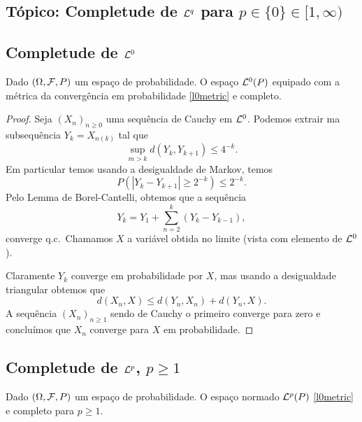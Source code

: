 \begin{topics}
\section{Tópico: Completude de ${\mathcal L}^q$ para $p\in \{0\}\in [1,\infty)$}


\subsection{Completude de ${\mathcal L}^0$}

\begin{theorem}
Dado $(\Omega,{\mathcal F},P)$ um espaço de probabilidade.
O espaço ${\mathcal L}^0(P)$ equipado com a métrica  da convergência em probabilidade \eqref{l0metric} e completo.

\end{theorem}


\begin{proof}


Seja $(X_n)_{n\ge 0}$ uma sequência de Cauchy em ${\mathcal L}^0$.
Podemos extrair ma subsequência $Y_k=X_{n(k)}$ tal que
\begin{equation}
\sup_{m>k} d(Y_k,Y_{k+1})\le  4^{-k}.
\end{equation}
Em particular temos usando a desigualdade de Markov, temos
\begin{equation}
P(|Y_k-Y_{k+1}|\ge 2^{-k})\le 2^{-k}.
\end{equation}
Pelo Lemma de Borel-Cantelli, obtemos que a sequência
$$Y_k=Y_1+\sum_{n=2}^k (Y_k-Y_{k-1}),$$
 converge q.c.\ Chamamos $X$ a variável obtida no limite (vista com elemento de ${\mathcal L}^0$).

 \medskip

 Claramente $Y_k$ converge em probabilidade por $X$, mas usando a desigualdade triangular obtemos que
 $$d(X_n,X)\le d(Y_{n},X_n)+d(Y_n,X).$$
 A sequência $(X_n)_{n\ge 1}$ sendo de Cauchy o primeiro converge para zero e concluímos que
 $X_n$ converge para $X$ em probabilidade.
\end{proof}

\subsection{Completude de ${\mathcal L}^p$, $p\ge 1$}


 \begin{theorem}
Dado $(\Omega,{\mathcal F},P)$ um espaço de probabilidade.
O espaço normado ${\mathcal L}^p(P)$ \eqref{l0metric} e completo para $p\ge 1$.

\end{theorem}


\end{topics}
